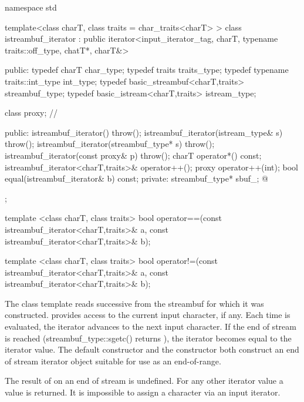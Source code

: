 %
\begin{codeblock}
namespace std {
  template<class charT, class traits = char_traits<charT> >
  class istreambuf_iterator
     : public iterator<input_iterator_tag, charT,
                       typename traits::off_type, chatT*, charT&> {
  public:
    typedef charT                         char_type;
    typedef traits                        traits_type;
    typedef typename traits::int_type     int_type;
    typedef basic_streambuf<charT,traits> streambuf_type;
    typedef basic_istream<charT,traits>   istream_type;

    class proxy;                        // \expos

    public:
      istreambuf_iterator() throw();
      istreambuf_iterator(istream_type& s) throw();
      istreambuf_iterator(streambuf_type* s) throw();
      istreambuf_iterator(const proxy& p) throw();
      charT operator*() const;
      istreambuf_iterator<charT,traits>& operator++();
      proxy operator++(int);
      bool equal(istreambuf_iterator& b) const;
    private:
      streambuf_type* sbuf_;  @\expos@
  };

  template <class charT, class traits>
    bool operator==(const istreambuf_iterator<charT,traits>& a,
                    const istreambuf_iterator<charT,traits>& b);

  template <class charT, class traits>
    bool operator!=(const istreambuf_iterator<charT,traits>& a,
                    const istreambuf_iterator<charT,traits>& b);
}
\end{codeblock}

\pnum
The class template  reads successive 
from the streambuf for which it was constructed.  provides
access to the current input character, if any. Each time
 is evaluated, the iterator advances to the next input
character. If the end of stream is reached (streambuf_type::sgetc() returns
), the iterator becomes equal to the 
iterator value. The default constructor  and the
constructor  both construct an end of stream
iterator object suitable for use as an end-of-range.

\pnum
The result of  on an end of stream is undefined. For any
other iterator value a  value is returned. It is impossible
to assign a character via an input iterator.

